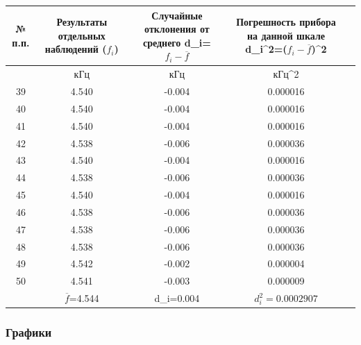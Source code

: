 \begin{center}
\begin{table}[H]
\centering

\label{tabl:11}
\begin{tabular}{|c|c|c|c|c|}
\hline
\begin{minipage}{7mm}
    № п.п. 
\end{minipage}&
\begin{minipage}{5cm}
    Результаты отдельных наблюдений ($f_i$)
\end{minipage} &
\begin{minipage}{5cm}
    Случайные отклонения от среднего d_i=$f_i-\overline{f}$
\end{minipage} &
\begin{minipage}{5cm}
    Погрешность прибора на данной шкале d_i^2=($f_i-$$\overline{f}$)^2
\end{minipage}\\
\hline
{}&кГц&кГц&кГц^2\\
\hline
39 &  4.540  &  -0.004 & 0.000016 \\
40 &  4.540  &  -0.004 & 0.000016 \\
41 &  4.540  &  -0.004 & 0.000016 \\
42 &  4.538  &  -0.006 & 0.000036 \\
43 &  4.540  &  -0.004 & 0.000016 \\
44 &  4.538  &  -0.006 & 0.000036 \\
45 &  4.540  &  -0.004 & 0.000016 \\
46 &  4.538  &  -0.006 & 0.000036 \\
47 &  4.538  &  -0.006 & 0.000036 \\
48 &  4.538  &  -0.006 & 0.000036 \\
49 &  4.542  &  -0.002 & 0.000004 \\
50 &  4.541  &  -0.003 & 0.000009 \\
\hline
   &  $\overline{f}$=4.544 & d_i=0.004 & $d_i^2=0.0002907$\\
\hline
\end{tabular}
\end{table}
\end{center}

\subsubsection{Графики}

